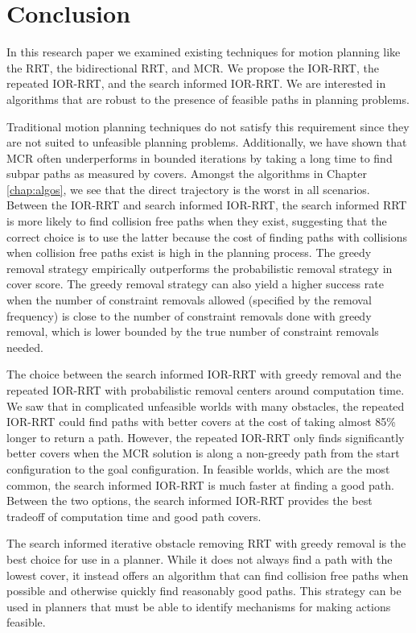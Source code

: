 \chapter{Conclusion}
In this research paper we examined existing techniques for motion planning like the RRT, the bidirectional RRT, and MCR. We propose the IOR-RRT, the repeated IOR-RRT, and the search informed IOR-RRT. We are interested in algorithms that are robust to the presence of feasible paths in planning problems.

Traditional motion planning techniques do not satisfy this requirement since they are not suited to unfeasible planning problems. Additionally, we have shown that MCR often underperforms in bounded iterations by taking a long time to find subpar paths as measured by covers. Amongst the algorithms in Chapter \ref{chap:algos}, we see that the direct trajectory is the worst in all scenarios. Between the IOR-RRT and search informed IOR-RRT, the search informed RRT is more likely to find collision free paths when they exist, suggesting that the correct choice is to use the latter because the cost of finding paths with collisions when collision free paths exist is high in the planning process. The greedy removal strategy empirically outperforms the probabilistic removal strategy in cover score. The greedy removal strategy can also yield a higher success rate when the number of constraint removals allowed (specified by the removal frequency) is close to the number of constraint removals done with greedy removal, which is lower bounded by the true number of constraint removals needed.

The choice between the search informed IOR-RRT with greedy removal and the repeated IOR-RRT with probabilistic removal centers around computation time. We saw that in complicated unfeasible worlds with many obstacles, the repeated IOR-RRT could find paths with better covers at the cost of taking almost 85\% longer to return a path. However, the repeated IOR-RRT only finds significantly better covers when the MCR solution is along a non-greedy path from the start configuration to the goal configuration. In feasible worlds, which are the most common, the search informed IOR-RRT is much faster at finding a good path. Between the two options, the search informed IOR-RRT provides the best tradeoff of computation time and good path covers.

The search informed iterative obstacle removing RRT with greedy removal is the best choice for use in a planner. While it does not always find a path with the lowest cover, it instead offers an algorithm that can find collision free paths when possible and otherwise quickly find reasonably good paths. This strategy can be used in planners that must be able to identify mechanisms for making actions feasible.